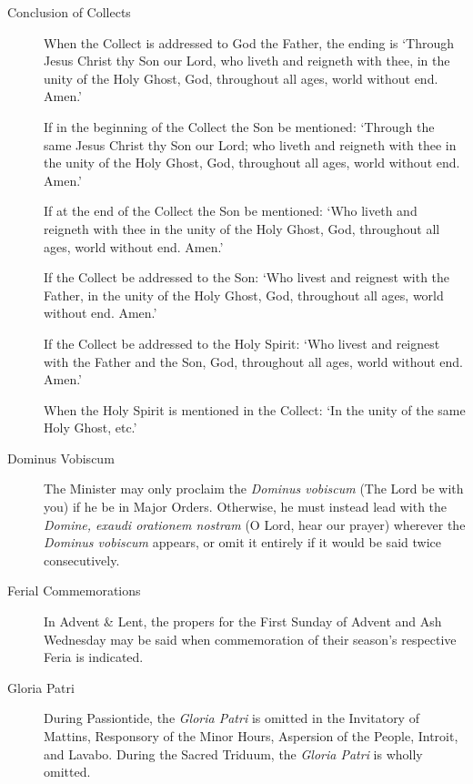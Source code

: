 \begin{description}
\item[Conclusion of Collects] When the Collect is addressed to God the Father, the ending is `Through Jesus Christ thy Son our Lord, who liveth and reigneth with thee, in the unity of the Holy Ghost, God, throughout all ages, world without end. Amen.'\par
If in the beginning of the Collect the Son be mentioned: `Through the same Jesus Christ thy Son our Lord; who liveth and reigneth with thee in the unity of the Holy Ghost, God, throughout all ages, world without end. Amen.'\par
If at the end of the Collect the Son be mentioned: `Who liveth and reigneth with thee in the unity of the Holy Ghost, God, throughout all ages, world without end. Amen.'\par
If the Collect be addressed to the Son: `Who livest and reignest with the Father, in the unity of the Holy Ghost, God, throughout all ages, world without end. Amen.'\par
If the Collect be addressed to the Holy Spirit: `Who livest and reignest with the Father and the Son, God, throughout all ages, world without end. Amen.'\par
When the Holy Spirit is mentioned in the Collect: `In the unity of the same Holy Ghost, etc.'
\item[Dominus Vobiscum] The Minister may only proclaim the \emph{Dominus vobiscum} (The Lord be with you) if he be in Major Orders. Otherwise, he must instead lead with the \emph{Domine, exaudi orationem nostram} (O Lord, hear our prayer) wherever the \emph{Dominus vobiscum} appears, or omit it entirely if it would be said twice consecutively.
\item[Ferial Commemorations] In Advent \& Lent, the propers for the First Sunday of Advent and Ash Wednesday may be said when commemoration of their season's respective Feria is indicated.
\item[Gloria Patri] During Passiontide, the \emph{Gloria Patri} is omitted in the Invitatory of Mattins, Responsory of the Minor Hours, Aspersion of the People, Introit, and Lavabo. During the Sacred Triduum, the \emph{Gloria Patri} is wholly omitted.

\end{description}
